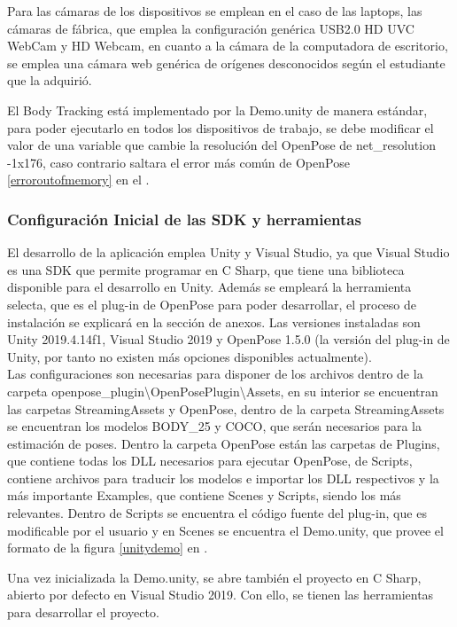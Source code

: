 Para las cámaras de los dispositivos se emplean en el caso de las laptops, las cámaras de fábrica, que emplea la configuración genérica USB2.0 HD UVC WebCam y HD Webcam, en cuanto a la cámara de la computadora de escritorio, se emplea una cámara web genérica de orígenes desconocidos según el estudiante que la adquirió. 

El Body Tracking está implementado por la Demo.unity de manera estándar, para poder ejecutarlo en todos los dispositivos de trabajo, se debe modificar el valor de una variable que cambie la resolución del OpenPose de net\_resolution -1x176, caso contrario saltara el error más común de OpenPose \ref{erroroutofmemory} en el .


\subsubsection{Configuración Inicial de las SDK y herramientas}

El desarrollo de la aplicación emplea Unity y Visual Studio, ya que Visual Studio es una SDK que permite programar en C Sharp, que tiene una biblioteca disponible para el desarrollo en Unity. Además se empleará la herramienta selecta, que es el plug-in de OpenPose para poder desarrollar, el proceso de instalación se explicará en la sección de anexos. Las versiones instaladas son Unity 2019.4.14f1, Visual Studio 2019 y OpenPose 1.5.0 (la versión del plug-in de Unity, por tanto no existen más opciones disponibles actualmente).
\\
Las configuraciones son necesarias para disponer de los archivos dentro de la carpeta openpose\_plugin\textbackslash OpenPosePlugin\textbackslash Assets, en su interior se encuentran las carpetas StreamingAssets y OpenPose, dentro de la carpeta StreamingAssets se encuentran los modelos BODY\_25 y COCO, que serán necesarios para la estimación de poses. Dentro la carpeta OpenPose están las carpetas de Plugins, que contiene todas los DLL necesarios para ejecutar OpenPose, de Scripts, contiene archivos para traducir los modelos e importar los DLL respectivos y la más importante Examples, que contiene Scenes y Scripts, siendo los más relevantes. Dentro de Scripts se encuentra el código fuente del plug-in, que es modificable por el usuario y en Scenes se encuentra el Demo.unity, que provee el formato de la figura \ref{unitydemo} en .

Una vez inicializada la Demo.unity, se abre también el proyecto en C Sharp, abierto por defecto en Visual Studio 2019. Con ello, se tienen las herramientas para desarrollar el proyecto.

